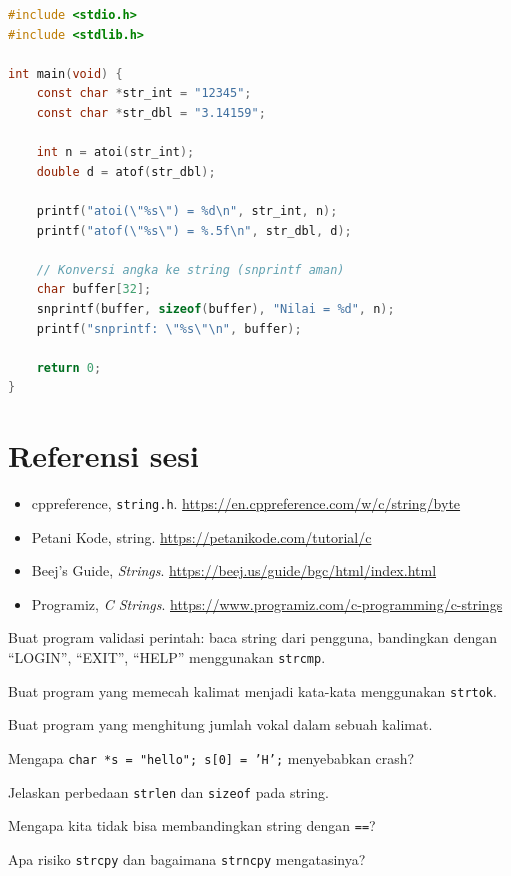 \documentclass[../main.tex]{subfiles}
\begin{document}
\begin{lstlisting}[language=C,caption=Konversi string ke angka]
#include <stdio.h>
#include <stdlib.h>

int main(void) {
    const char *str_int = "12345";
    const char *str_dbl = "3.14159";
    
    int n = atoi(str_int);
    double d = atof(str_dbl);
    
    printf("atoi(\"%s\") = %d\n", str_int, n);
    printf("atof(\"%s\") = %.5f\n", str_dbl, d);
    
    // Konversi angka ke string (snprintf aman)
    char buffer[32];
    snprintf(buffer, sizeof(buffer), "Nilai = %d", n);
    printf("snprintf: \"%s\"\n", buffer);
    
    return 0;
}
\end{lstlisting}

\section{Referensi sesi}
\begin{itemize}[leftmargin=*]
  \item cppreference, \texttt{string.h}. \url{https://en.cppreference.com/w/c/string/byte}
  \item Petani Kode, string. \url{https://petanikode.com/tutorial/c}
  \item Beej's Guide, \textit{Strings}. \url{https://beej.us/guide/bgc/html/index.html}
  \item Programiz, \textit{C Strings}. \url{https://www.programiz.com/c-programming/c-strings}
\end{itemize}

\begin{aktivitas}
  \item Buat program validasi perintah: baca string dari pengguna, bandingkan dengan ``LOGIN'', ``EXIT'', ``HELP'' menggunakan \texttt{strcmp}.
  \item Buat program yang memecah kalimat menjadi kata-kata menggunakan \texttt{strtok}.
  \item Buat program yang menghitung jumlah vokal dalam sebuah kalimat.
\end{aktivitas}

\begin{latihan}
  \item Mengapa \texttt{char *s = "hello"; s[0] = 'H';} menyebabkan crash?
  \item Jelaskan perbedaan \texttt{strlen} dan \texttt{sizeof} pada string.
  \item Mengapa kita tidak bisa membandingkan string dengan \texttt{==}?
  \item Apa risiko \texttt{strcpy} dan bagaimana \texttt{strncpy} mengatasinya?
\end{latihan}
\end{document}
